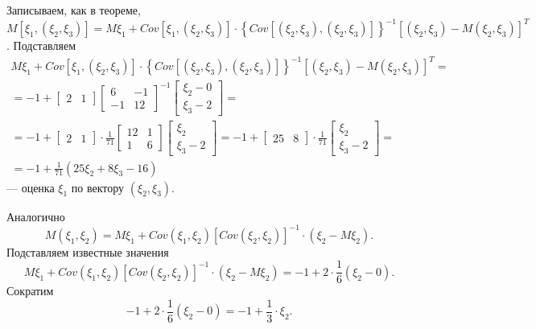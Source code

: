 \begin{enumerate}[label=\alph*)]
  Записываем, как в теореме,
  $M \left[ \xi_1, \left( \xi_2, \xi_3 \right) \right] =
    M \xi_1 +
    Cov \left[ \xi_1, \left( \xi_2, \xi_3 \right) \right] \cdot
    \left\{
      Cov \left[ \left( \xi_2, \xi_3 \right), \left( \xi_2, \xi_3 \right) \right]
    \right\}^{-1} \left[ \left( \xi_2, \xi_3 \right) - M \left( \xi_2, \xi_3 \right) \right]^T$.
  Подставляем
  \begin{equation*}
    \begin{split}
      M \xi_1 +
      Cov \left[ \xi_1, \left( \xi_2, \xi_3 \right) \right] \cdot
      \left\{
        Cov \left[ \left( \xi_2, \xi_3 \right), \left( \xi_2, \xi_3 \right) \right]
      \right\}^{-1}
      \left[ \left( \xi_2, \xi_3 \right) - M \left( \xi_2, \xi_3 \right) \right]^T = \\
      = -1 +
      \begin{bmatrix}
        2 & 1
      \end{bmatrix}
      \begin{bmatrix}
        6 & -1 \\
        -1 & 12
      \end{bmatrix}^{-1}
      \begin{bmatrix}
        \xi_2 - 0 \\
        \xi_3 - 2
      \end{bmatrix} = \\
      = -1 +
      \begin{bmatrix}
        2 & 1
      \end{bmatrix} \cdot \frac{1}{71}
      \begin{bmatrix}
        12 & 1 \\
        1 & 6
      \end{bmatrix}
      \begin{bmatrix}
        \xi_2 \\
        \xi_3 - 2
      \end{bmatrix} =
      -1 +
      \begin{bmatrix}
        25 & 8
      \end{bmatrix} \cdot \frac{1}{71}
      \begin{bmatrix}
        \xi_2 \\
        \xi_3 - 2
      \end{bmatrix} = \\
      = -1 + \frac{1}{71} \left( 25 \xi_2 + 8 \xi_3 - 16 \right)
    \end{split}
  \end{equation*}
  --- оценка $ \xi_1$ по вектору $ \left( \xi_2, \xi_3 \right)$.

  Аналогично
  $$M \left( \xi_1, \xi_2 \right) =
    M \xi_1 +
    Cov \left( \xi_1, \xi_2 \right) \left[ Cov \left( \xi_2, \xi_2 \right) \right]^{-1} \cdot
    \left( \xi_2 - M \xi_2 \right).$$
  Подставляем известные значения
  $$M \xi_1 +
    Cov \left( \xi_1, \xi_2 \right) \left[ Cov \left( \xi_2, \xi_2 \right) \right]^{-1} \cdot
    \left( \xi_2 - M \xi_2 \right) =
    -1 + 2 \cdot \frac{1}{6} \left( \xi_2 - 0 \right).$$
  Сократим
  $$-1 + 2 \cdot \frac{1}{6} \left( \xi_2 - 0 \right) =
    -1 + \frac{1}{3} \cdot \xi_2.$$
\end{enumerate}

